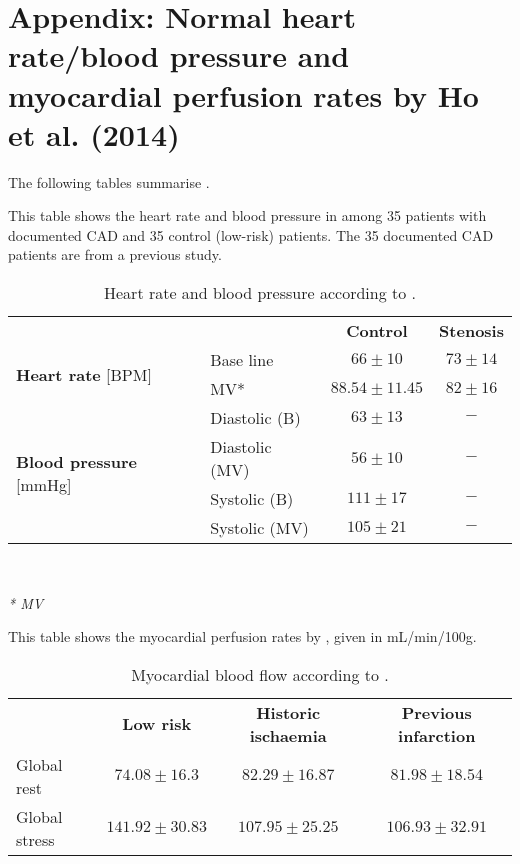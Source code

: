 \chapter{Appendix: Normal heart rate/blood pressure and myocardial perfusion rates by Ho et al. (2014)}\label{app:physoverview_ho}
The following tables summarise \cite{ho2014dynamic}.
\begin{table}[h!]
\caption{Heart rate and blood pressure according to \cite{ho2014dynamic}.}
This table shows the heart rate and blood pressure in \citep{ho2014dynamic} among 35 patients with documented \ac{CAD} and 35 control (low-risk) patients. The 35 documented CAD patients are from a previous study.
\begin{tabular}{l|l|cc|}
          \multicolumn{1}{c}{ } & \multicolumn{1}{c}{ } &  \multicolumn{1}{c}{\textbf{Control}} & \multicolumn{1}{c}{\textbf{Stenosis}} \\
          \cline{2-4}
\multirow{2}{*}{\textbf{Heart rate} [BPM]} &  Base line &  $66\pm 10$ &  $73\pm 14$  \\
& MV* &  $88.54\pm 11.45$ & $82\pm 16$   \\
\cline{2-4}
\multirow{4}{*}{\textbf{Blood pressure} [mmHg]} & Diastolic (B) & $63\pm 13$ & $-$ \\
& Diastolic (MV)& $56 \pm 10$ & $-$ \\
& Systolic (B) 	& $111\pm 17$ & $-$ \\
& Systolic (MV) & $105\pm 21$ & $-$ \\
\cline{2-4}
\end{tabular} \\
\raggedright
\textit{* \acf{MV}}
\label{tab:ho_physfact}
\end{table}

\begin{table}[h!]
\caption{Myocardial blood flow according to \cite{ho2014dynamic}.}
This table shows the myocardial perfusion rates by \cite{ho2014dynamic}, given in mL/min/100g.\\
\begin{tabular}{l|ccc|}
			\multicolumn{1}{c}{ } & \multicolumn{1}{c}{\textbf{Low risk}} & \multicolumn{1}{c}{\textbf{Historic ischaemia}} & \multicolumn{1}{c}{\textbf{Previous infarction}} \\
          \cline{2-4}
Global rest 	& $74.08\pm 16.3$ & $82.29\pm 16.87$ & $81.98\pm 18.54$\\
Global stress   & $141.92\pm 30.83$ & $107.95\pm 25.25$ & $106.93\pm 32.91$\\
\cline{2-4}
\end{tabular} \\
\label{tab:hoFlows}
\end{table}